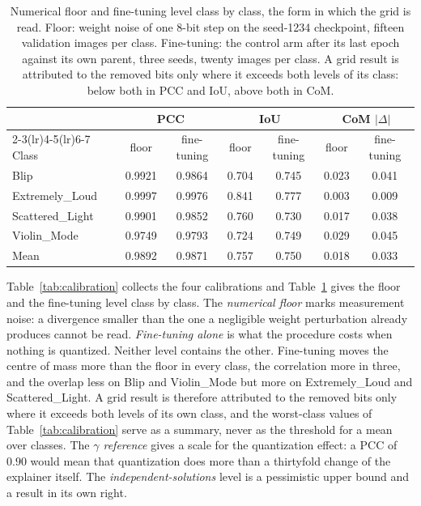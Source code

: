 \begin{table}[htbp]
\centering
\small
\begin{tabular}{lcccccc}
\toprule
 & \multicolumn{2}{c}{PCC} & \multicolumn{2}{c}{IoU} & \multicolumn{2}{c}{CoM $|\Delta|$} \\
\cmidrule(lr){2-3}\cmidrule(lr){4-5}\cmidrule(lr){6-7}
Class & floor & fine-tuning & floor & fine-tuning & floor & fine-tuning \\
\midrule
Blip             & 0.9921 & 0.9864 & 0.704 & 0.745 & 0.023 & 0.041 \\
Extremely\_Loud  & 0.9997 & 0.9976 & 0.841 & 0.777 & 0.003 & 0.009 \\
Scattered\_Light & 0.9901 & 0.9852 & 0.760 & 0.730 & 0.017 & 0.038 \\
Violin\_Mode     & 0.9749 & 0.9793 & 0.724 & 0.749 & 0.029 & 0.045 \\
\midrule
Mean             & 0.9892 & 0.9871 & 0.757 & 0.750 & 0.018 & 0.033 \\
\bottomrule
\end{tabular}
\caption{Numerical floor and fine-tuning level class by class, the form in which
the grid is read. Floor: weight noise of one 8-bit step on the seed-1234
checkpoint, fifteen validation images per class. Fine-tuning: the control arm
after its last epoch against its own parent, three seeds, twenty images per
class. A grid result is attributed to the removed bits only where it exceeds
both levels of its class: below both in PCC and IoU, above both in CoM.}
\label{tab:levels-class}
\end{table}

Table~\ref{tab:calibration} collects the four calibrations and
Table~\ref{tab:levels-class} gives the floor and the fine-tuning level class by
class. The \emph{numerical floor} marks measurement noise: a divergence smaller
than the one a negligible weight perturbation already produces cannot be read.
\emph{Fine-tuning alone} is what the procedure costs when nothing is quantized.
Neither level contains the other. Fine-tuning moves the centre of mass more than
the floor in every class, the correlation more in three, and the overlap less on
Blip and Violin\_Mode but more on Extremely\_Loud and Scattered\_Light. A grid
result is therefore attributed to the removed bits only where it exceeds both
levels of its own class, and the worst-class values of
Table~\ref{tab:calibration} serve as a summary, never as the threshold for a mean
over classes. The \emph{$\gamma$ reference} gives a scale for the quantization
effect: a PCC of $0.90$ would mean that quantization does more than a thirtyfold
change of the explainer itself. The \emph{independent-solutions} level is a
pessimistic upper bound and a result in its own right.

